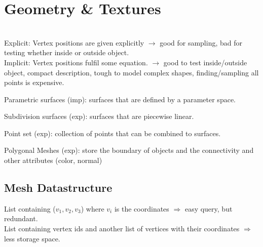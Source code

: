 \section{Geometry \& Textures}
 \\
Explicit: Vertex positions are given explicitly $\rightarrow$ good for sampling, bad for testing whether inside or outside object. \\
Implicit: Vertex positions fulfil some equation. $\rightarrow$ good to test inside/outside object, compact description, tough to model complex shapes, finding/sampling all points is expensive.\\
\begin{compactitem}
    \item Parametric surfaces (imp): surfaces that are defined by a
parameter space. 
    \item Subdivision surfaces (exp): surfaces that are piecewise linear.
    \item Point set (exp): collection of points that can be
combined to surfaces.
    \item Polygonal Meshes (exp): store the boundary of objects and the connectivity and other attributes (color, normal)
\end{compactitem}

\subsection*{Mesh Datastructure}

 List containing ($v_1, v_2, v_3$) where $v_i$ is the coordinates $\Rightarrow$ easy query, but redundant.\\
 List containing vertex ids and another list of vertices with their coordinates $\Rightarrow$ less storage space.

